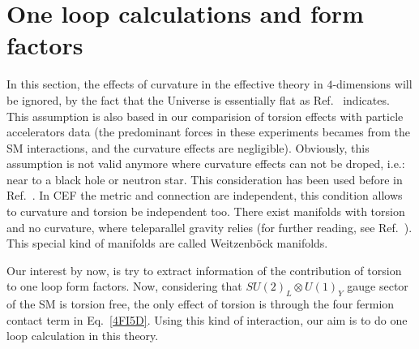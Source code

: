 \section{One loop calculations and form factors}

In this section, the effects of curvature in the effective theory in $4$-dimensions will be ignored, by the fact that the Universe is essentially flat as Ref.~\cite{Larson:2010gs} indicates. This assumption is also based in our comparision of torsion effects with particle accelerators data (the predominant forces in these experiments becames from the SM interactions, and the curvature effects are negligible). Obviously, this assumption is not valid anymore where curvature effects can not be droped, i.e.: near to a black hole or neutron star. This consideration has been used before in Ref.~\cite{Carroll:1994dq,Belyaev:1998ax}. In CEF the metric and connection are independent, this condition allows to curvature and torsion be independent too. There exist manifolds with torsion and no curvature, where teleparallel gravity relies (for further reading, see Ref.~\cite{Arcos:2005ec}). This special kind of manifolds are called Weitzenb\"ock manifolds.

Our interest by now, is try to extract information of the contribution of torsion to one loop form factors. Now, considering that $SU(2)_L\otimes U(1)_Y$ gauge sector of the SM is torsion free, the only effect of torsion is through the four fermion contact term in Eq.~\eqref{4FI5D}. Using this kind of interaction, our aim is to do one loop calculation in this theory. 

